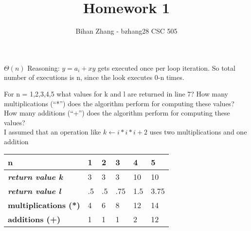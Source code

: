 \documentclass[12pt]{article}
\newenvironment{question}[2][Question]{\begin{trivlist}
		\item[\hskip \labelsep {\bfseries #1}\hskip \labelsep {\bfseries #2.}]}{\end{trivlist}}
\begin{document}
	
	
	
	\title{Homework 1}%
	\author{Bihan Zhang - bzhang28 %
		CSC 505} %
	
	\maketitle
	
	
	\begin{question}{1a} 
	$\Theta(n)$
	Reasoning: $y = a_i+ x  y$ gets executed once per loop iteration. So total number of executions is n, since the look executes 0-n times. 		
	\end{question}

	\begin{question}{1b} 
	\end{question}
		
	\begin{question}{2a} 
		For n = 1,2,3,4,5 what values for k and l are returned in line 7? How many multiplications (“*”) does the algorithm perform for computing these values? How many additions (“+”) does the algorithm perform for computing these values?\\
		I assumed that an operation like $k \leftarrow i*i*i+2$ uses two multiplications and one addition	
		
		\begin{tabular}{|l|l|l|l|l|l|}
			\hline
			\textbf{n}                       & \textbf{1} & \textbf{2} & \textbf{3} & \textbf{4} & \textbf{5} \\ \hline
			\textit{\textbf{return value k}} & 3          & 3          & 3          & 10         & 10         \\ \hline
			\textit{\textbf{return value l}} & .5         & .5         & .75        & 1.5        & 3.75       \\ \hline
			\textbf{multiplications (*)}     & 4          & 6          & 8          & 12         & 14         \\ \hline
			\textbf{additions (+)}           & 1          & 1          & 1          & 2          & 12         \\ \hline
		\end{tabular}
		
	\end{question}
\end{document}

